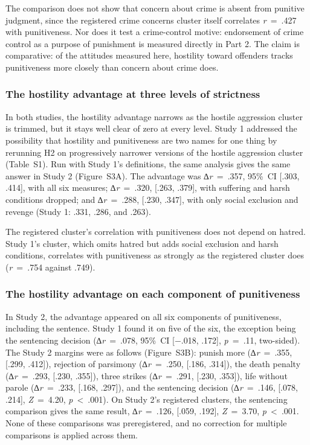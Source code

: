 The comparison does not show that concern about crime is absent from punitive judgment, since the registered crime concerns cluster itself correlates \emph{r}~=~.427 with punitiveness. Nor does it test a crime-control motive: endorsement of crime control as a purpose of punishment is measured directly in Part 2. The claim is comparative: of the attitudes measured here, hostility toward offenders tracks punitiveness more closely than concern about crime does.

\subsubsection{The hostility advantage at three levels of strictness}\label{the-hostility-advantage-at-three-levels-of-strictness}

In both studies, the hostility advantage narrows as the hostile aggression cluster is trimmed, but it stays well clear of zero at every level. Study 1 addressed the possibility that hostility and punitiveness are two names for one thing by rerunning H2 on progressively narrower versions of the hostile aggression cluster (Table~S1). Run with Study 1's definitions, the same analysis gives the same answer in Study 2 (Figure~S3A). The advantage was ∆\emph{r}~=~.357, 95\%~CI {[}.303, .414{]}, with all six measures; ∆\emph{r}~=~.320, {[}.263, .379{]}, with suffering and harsh conditions dropped; and ∆\emph{r}~=~.288, {[}.230, .347{]}, with only social exclusion and revenge (Study 1: .331, .286, and .263).

The registered cluster's correlation with punitiveness does not depend on hatred. Study 1's cluster, which omits hatred but adds social exclusion and harsh conditions, correlates with punitiveness as strongly as the registered cluster does (\emph{r}~=~.754 against .749).

\subsubsection{The hostility advantage on each component of punitiveness}\label{the-hostility-advantage-on-each-component-of-punitiveness}

In Study 2, the advantage appeared on all six components of punitiveness, including the sentence. Study 1 found it on five of the six, the exception being the sentencing decision (∆\emph{r}~=~.078, 95\%~CI {[}−.018, .172{]}, \emph{p}~=~.11, two-sided). The Study 2 margins were as follows (Figure~S3B): punish more (∆\emph{r}~=~.355, {[}.299, .412{]}), rejection of parsimony (∆\emph{r}~=~.250, {[}.186, .314{]}), the death penalty (∆\emph{r}~=~.293, {[}.230, .355{]}), three strikes (∆\emph{r}~=~.291, {[}.230, .353{]}), life without parole (∆\emph{r}~=~.233, {[}.168, .297{]}), and the sentencing decision (∆\emph{r}~=~.146, {[}.078, .214{]}, \emph{Z}~=~4.20, \emph{p}~\textless{}~.001). On Study 2's registered clusters, the sentencing comparison gives the same result, ∆\emph{r}~=~.126, {[}.059, .192{]}, \emph{Z}~=~3.70, \emph{p}~\textless{}~.001. None of these comparisons was preregistered, and no correction for multiple comparisons is applied across them.

